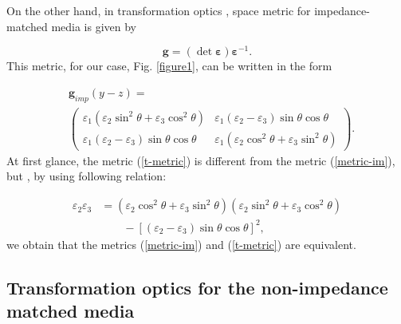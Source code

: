 \documentclass[9pt,twocolumn,twoside]{osajnl}
\begin{document}
On the other hand, in transformation optics \cite{leonhardt2012geometry},  space metric for impedance-matched media is given by 

\begin{equation}
\mathbf{g}=(\det{ \boldsymbol{\varepsilon}})\boldsymbol{\varepsilon}^{-1}.
\end{equation}
This metric, for our case, Fig. \ref{figure1}, can be written in the form 

\begin{align}\label{t-metric}
&\mathbf{g}_{imp}(y-z)= \nonumber\\
&\begin{pmatrix}
\varepsilon_{1}(\varepsilon_{2} \sin^{2}{\theta} +\varepsilon_{3}\cos^{2}{\theta})& \varepsilon_{1}(\varepsilon_{2}-\varepsilon_{3})\sin{\theta} \cos{\theta}\\
\varepsilon_{1}(\varepsilon_{2}-\varepsilon_{3})\sin{\theta} \cos{\theta}&\varepsilon_{1}(\varepsilon_{2} \cos^2{\theta} +\varepsilon_{3}\sin^{2}{\theta})
\end{pmatrix}.
\end{align}
At first glance, the metric (\ref{t-metric}) is different from the metric (\ref{metric-im}), but , by using following relation:  

\begin{equation}\label{dz}
\begin{split}
\varepsilon_{2} \varepsilon_{3}&=(\varepsilon_{2} \cos^2{\theta} +\varepsilon_{3}\sin^{2}{\theta})(\varepsilon_{2} \sin^{2}{\theta} +\varepsilon_{3}\cos^{2}{\theta})  \\
&   \qquad  -\left[ (\varepsilon_{2}-\varepsilon_{3})\sin{\theta} \cos{\theta}\right]^{2},
\end{split}
\end{equation}
 we obtain that the metrics (\ref{metric-im})  and (\ref{t-metric}) are equivalent.

\subsection{Transformation optics for the non-impedance matched media}
\end{document}
